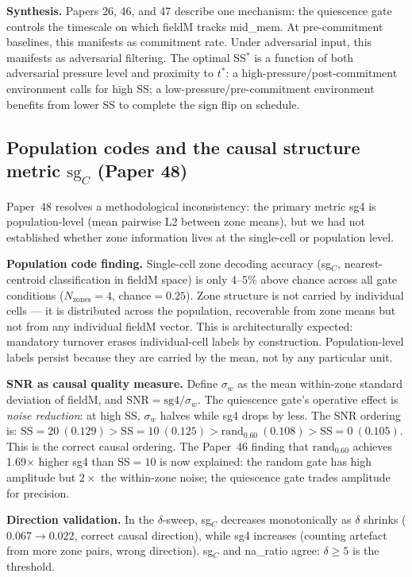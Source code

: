 \documentclass[11pt]{article}
\begin{document}
\textbf{Synthesis.}  Papers 26, 46, and 47 describe one mechanism:
the quiescence gate controls the timescale on which fieldM tracks
mid\_mem.  At pre-commitment baselines, this manifests as commitment
rate.  Under adversarial input, this manifests as adversarial filtering.
The optimal SS$^*$ is a function of both adversarial pressure level
and proximity to $t^*$: a high-pressure/post-commitment environment
calls for high SS; a low-pressure/pre-commitment environment
benefits from lower SS to complete the sign flip on schedule.

\subsection{Population codes and the causal structure metric $\mathrm{sg}_C$ (Paper 48)}

Paper~48 resolves a methodological inconsistency: the primary metric sg4 is
population-level (mean pairwise L2 between zone means), but we had not established
whether zone information lives at the single-cell or population level.

\textbf{Population code finding.}
Single-cell zone decoding accuracy (sg$_C$, nearest-centroid classification in
fieldM space) is only 4--5\% above chance across all gate conditions
($N_\mathrm{zones}=4$, chance$=0.25$).
Zone structure is not carried by individual cells --- it is distributed across
the population, recoverable from zone means but not from any individual fieldM vector.
This is architecturally expected: mandatory turnover erases individual-cell labels
by construction.  Population-level labels persist because they are carried by the
mean, not by any particular unit.

\textbf{SNR as causal quality measure.}
Define $\sigma_w$ as the mean within-zone standard deviation of fieldM, and
$\mathrm{SNR} = \mathrm{sg4}/\sigma_w$.
The quiescence gate's operative effect is \emph{noise reduction}: at high SS,
$\sigma_w$ halves while sg4 drops by less.  The SNR ordering is:
$\mathrm{SS}{=}20\ (0.129) > \mathrm{SS}{=}10\ (0.125) > \mathrm{rand}_{0.60}\ (0.108) > \mathrm{SS}{=}0\ (0.105)$.
This is the correct causal ordering.  The Paper~46 finding that
$\mathrm{rand}_{0.60}$ achieves 1.69$\times$ higher sg4 than SS$=10$ is now
explained: the random gate has high amplitude but $2\times$ the within-zone noise;
the quiescence gate trades amplitude for precision.

\textbf{Direction validation.}
In the $\delta$-sweep, sg$_C$ decreases monotonically as $\delta$ shrinks
($0.067 \to 0.022$, correct causal direction), while sg4 increases
(counting artefact from more zone pairs, wrong direction).
sg$_C$ and na\_ratio agree: $\delta \geq 5$ is the threshold.
\end{document}
